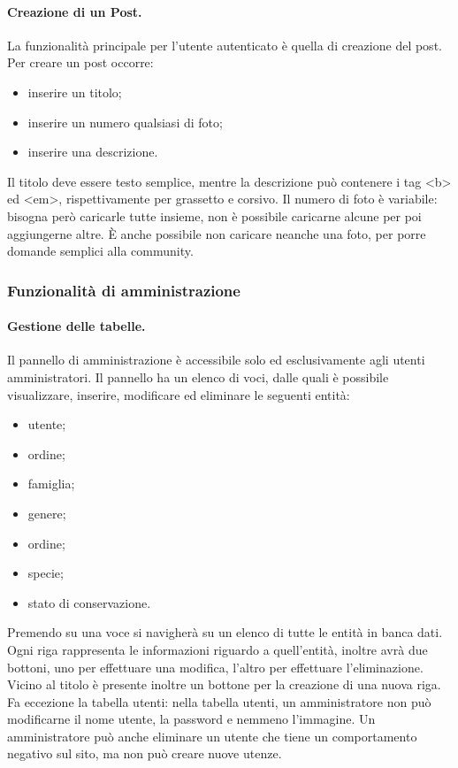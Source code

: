 \documentclass[12pt, a4paper]{article}
\begin{document}
    \paragraph{Creazione di un Post.} La funzionalità principale per l'utente autenticato è quella di creazione del post. Per creare un post occorre:
    \begin{itemize}
        \item inserire un titolo;
        \item inserire un numero qualsiasi di foto;
        \item inserire una descrizione.
    \end{itemize}
    Il titolo deve essere testo semplice, mentre la descrizione può contenere i tag <b> ed <em>, rispettivamente per grassetto e corsivo. Il numero di foto è variabile: bisogna però caricarle tutte insieme, non è possibile caricarne alcune per poi aggiungerne altre. È anche possibile non caricare neanche una foto, per porre domande semplici alla community.

    \subsubsection{Funzionalità di amministrazione}

    \paragraph{Gestione delle tabelle.}
    Il pannello di amministrazione è accessibile solo ed esclusivamente agli utenti amministratori. Il pannello ha un elenco di voci, dalle quali è possibile visualizzare, inserire, modificare ed eliminare le seguenti entità:
    \begin{itemize}
        \item utente;
        \item ordine;
        \item famiglia;
        \item genere;
        \item ordine;
        \item specie;
        \item stato di conservazione.
    \end{itemize}
    Premendo su una voce si navigherà su un elenco di tutte le entità in banca dati. Ogni riga rappresenta le informazioni riguardo a quell'entità, inoltre avrà due bottoni, uno per effettuare una modifica, l'altro per effettuare l'eliminazione. Vicino al titolo è presente inoltre un bottone per la creazione di una nuova riga. Fa eccezione la tabella utenti: nella tabella utenti, un amministratore non può modificarne il nome utente, la password e nemmeno l'immagine. Un amministratore può anche eliminare un utente che tiene un comportamento negativo sul sito, ma non può creare nuove utenze.
\end{document}
